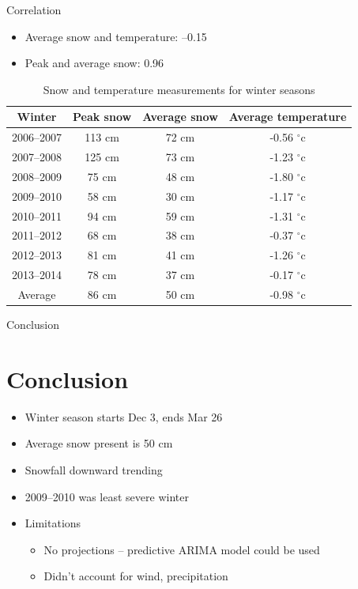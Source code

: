 \documentclass{beamer}
\begin{document}
\begin{frame}{Correlation}

\begin{itemize}
\item Average snow and temperature: --0.15
\item Peak and average snow: 0.96
\end{itemize}

\begin{table}[ht]
\begin{tabular}{c c c c}
\hline
Winter & Peak snow & Average snow & Average temperature \\ \hline
2006--2007 & 113 cm & 72 cm & -0.56 $^{\circ}$c \\
2007--2008 & 125 cm & 73 cm & -1.23 $^{\circ}$c \\
2008--2009 & 75 cm & 48 cm & -1.80 $^{\circ}$c \\
2009--2010 & 58 cm & 30 cm & -1.17 $^{\circ}$c \\
2010--2011 & 94 cm & 59 cm & -1.31 $^{\circ}$c \\
2011--2012 & 68 cm & 38 cm & -0.37 $^{\circ}$c \\
2012--2013 & 81 cm & 41 cm & -1.26 $^{\circ}$c \\
2013--2014 & 78 cm & 37 cm & -0.17 $^{\circ}$c \\ \hline
Average & 86 cm & 50 cm & -0.98 $^{\circ}$c \\ \hline
\end{tabular}
\caption{Snow and temperature measurements for winter seasons}
\end{table}

\end{frame}

\begin{frame}{Conclusion}

\section{Conclusion}

\begin{itemize}
\item Winter season starts Dec 3, ends Mar 26
\item Average snow present is 50 cm 
\item Snowfall downward trending
\item 2009--2010 was least severe winter 
\item Limitations
\begin{itemize}
\item No projections -- predictive ARIMA model could be used
\item Didn't account for wind, precipitation
\end{itemize}
\end{itemize}

\end{frame}
\end{document}
